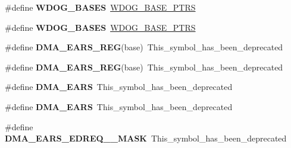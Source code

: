 \begin{DoxyCompactItemize}
\item 
\#define {\bfseries W\+D\+O\+G\+\_\+\+B\+A\+S\+ES}~\hyperlink{group__WDOG__Peripheral__Access__Layer_ga8d50dba3756857eed1783b3d726d40d8}{W\+D\+O\+G\+\_\+\+B\+A\+S\+E\+\_\+\+P\+T\+RS}\hypertarget{group__Backward__Compatibility__Symbols_ga8f0c76cde99d45e92a42fad4398beda7}{}\label{group__Backward__Compatibility__Symbols_ga8f0c76cde99d45e92a42fad4398beda7}

\item 
\#define {\bfseries W\+D\+O\+G\+\_\+\+B\+A\+S\+ES}~\hyperlink{group__WDOG__Peripheral__Access__Layer_ga8d50dba3756857eed1783b3d726d40d8}{W\+D\+O\+G\+\_\+\+B\+A\+S\+E\+\_\+\+P\+T\+RS}\hypertarget{group__Backward__Compatibility__Symbols_ga8f0c76cde99d45e92a42fad4398beda7}{}\label{group__Backward__Compatibility__Symbols_ga8f0c76cde99d45e92a42fad4398beda7}

\item 
\#define {\bfseries D\+M\+A\+\_\+\+E\+A\+R\+S\+\_\+\+R\+EG}(base)~This\+\_\+symbol\+\_\+has\+\_\+been\+\_\+deprecated\hypertarget{group__Backward__Compatibility__Symbols_ga66eb3de7d0217ad30b7a12a70320c527}{}\label{group__Backward__Compatibility__Symbols_ga66eb3de7d0217ad30b7a12a70320c527}

\item 
\#define {\bfseries D\+M\+A\+\_\+\+E\+A\+R\+S\+\_\+\+R\+EG}(base)~This\+\_\+symbol\+\_\+has\+\_\+been\+\_\+deprecated\hypertarget{group__Backward__Compatibility__Symbols_ga66eb3de7d0217ad30b7a12a70320c527}{}\label{group__Backward__Compatibility__Symbols_ga66eb3de7d0217ad30b7a12a70320c527}

\item 
\#define {\bfseries D\+M\+A\+\_\+\+E\+A\+RS}~This\+\_\+symbol\+\_\+has\+\_\+been\+\_\+deprecated\hypertarget{group__Backward__Compatibility__Symbols_ga2e868ab7a8a5df4ad496ba6929035154}{}\label{group__Backward__Compatibility__Symbols_ga2e868ab7a8a5df4ad496ba6929035154}

\item 
\#define {\bfseries D\+M\+A\+\_\+\+E\+A\+RS}~This\+\_\+symbol\+\_\+has\+\_\+been\+\_\+deprecated\hypertarget{group__Backward__Compatibility__Symbols_ga2e868ab7a8a5df4ad496ba6929035154}{}\label{group__Backward__Compatibility__Symbols_ga2e868ab7a8a5df4ad496ba6929035154}

\item 
\#define {\bfseries D\+M\+A\+\_\+\+E\+A\+R\+S\+\_\+\+E\+D\+R\+E\+Q\+\_\+\_\+\+M\+A\+SK}~This\+\_\+symbol\+\_\+has\+\_\+been\+\_\+deprecated\hypertarget{group__Backward__Compatibility__Symbols_gab6368234862b48e0a7f2309ace3992f6}{}\label{group__Backward__Compatibility__Symbols_gab6368234862b48e0a7f2309ace3992f6}


\end{DoxyCompactItemize}
